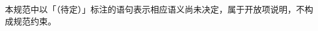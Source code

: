 
% 

\markboth{\contentsname}{}

\makeatletter
\renewcommand\@pnumwidth{2.5em}
\makeatother

\renewcommand{\figurename}{表}%
\renewcommand{\contentsname}{目录}
\renewcommand{\listtablename}{表格列表}
\renewcommand{\listfigurename}{图片列表}

\tableofcontents
\setcounter{tocdepth}{5}
\newpage
\listoftables
\newpage
\listoffigures

\newpage

\noindent 本规范中以「（待定）」标注的语句表示相应语义尚未决定，属于开放项说明，不构成规范约束。
